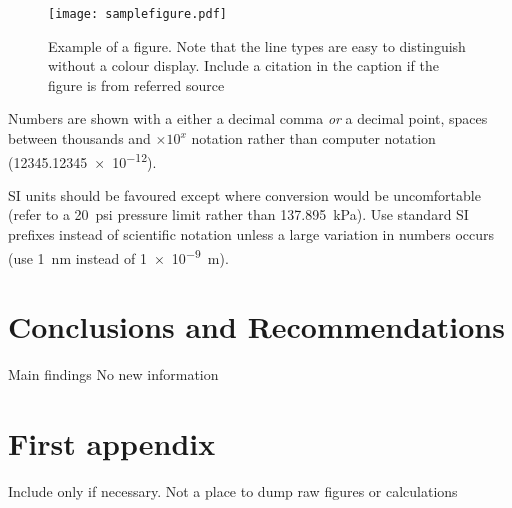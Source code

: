 \documentclass[a4paper,12pt]{article}
\begin{document}
\begin{figure}[htbp]
  \centering
  \texttt{[image: samplefigure.pdf]}
  \caption[Short caption which will be in the table of figures]{Example of a figure.  Note that the line types are easy to
    distinguish without a colour display.  Include a citation in the caption if the figure is from referred source}
  \label{fig:samplefigure}
\end{figure}

Numbers are shown with a either a decimal comma \emph{or} a decimal point, spaces between thousands and $\times 10^x$ notation rather than computer notation (\num{12345.12345e-12}).

SI units should be favoured except where conversion would be
uncomfortable (refer to a \SI{20}{psi} pressure limit rather than
\SI{137.895}{\kilo\pascal}).
Use standard
SI prefixes instead of scientific notation unless a large variation in
numbers occurs (use \SI{1}{\nano\meter} instead of \SI{1e-9}{\meter}).

\section{Conclusions and Recommendations}
Main findings
No new information




\appendix

\section{First appendix}
Include only if necessary. Not a place to dump raw figures or calculations
\end{document}
